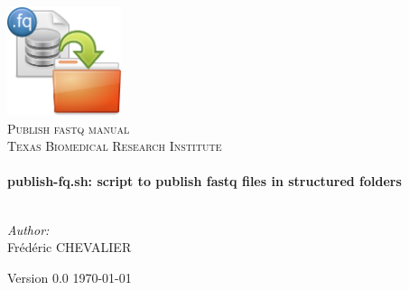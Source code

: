 \begin{titlepage}
\begin{center}

\includegraphics[width=0.25\textwidth]{Images/fastq.png}~\\[2.5cm]

\textsc{\LARGE Publish fastq manual}\\[1.5cm]

\textsc{\Large Texas Biomedical Research Institute}\\[0.5cm]

\HRule \\[0.4cm]
{ \huge \bfseries publish-fq.sh: script to publish fastq files in structured folders \\[0.4cm] }
\HRule \\[1.5cm]


\begin{center} \large
\emph{Author:} \\
Frédéric \textsc{CHEVALIER}
\end{center}


\vfill

Version 0.0
\hfill
\large \today

\end{center}
\end{titlepage}

